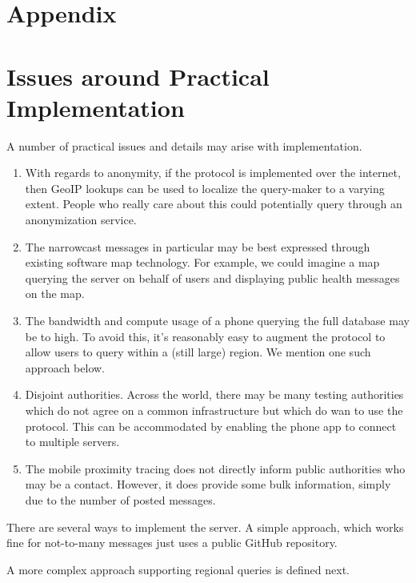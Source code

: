 \documentclass{article}
\begin{document}




\newpage
\appendix

\section*{Appendix}

\section{Issues around Practical Implementation}

A number of practical issues and details may arise with implementation.
\begin{enumerate}
    \item With regards to anonymity, if the protocol is implemented over the internet, then GeoIP lookups can be used to localize the query-maker to a varying extent.  People who really care about this could potentially query through an anonymization service.
    \item The narrowcast messages in particular may be best expressed through existing software map technology.   For example, we could imagine a map querying the server on behalf of users and displaying public health messages on the map.  
    \item The bandwidth and compute usage of a phone querying the full database may be to high.  To avoid this, it's reasonably easy to augment the protocol to allow users to query within a (still large) region.  We mention one such approach below.  
    \item Disjoint authorities.  Across the world, there may be many testing authorities which do not agree on a common infrastructure but which do wan to use the protocol.  This can be accommodated by enabling the phone app to connect to multiple servers. 
    \item The mobile proximity tracing does not directly inform public authorities who may be a contact.  However, it does provide some bulk information, simply due to the number of posted messages. 
\end{enumerate}

There are several ways to implement the server.  A simple approach, which works fine for not-to-many messages just uses a public GitHub repository.

A more complex approach supporting regional queries is defined next.  
\end{document}
